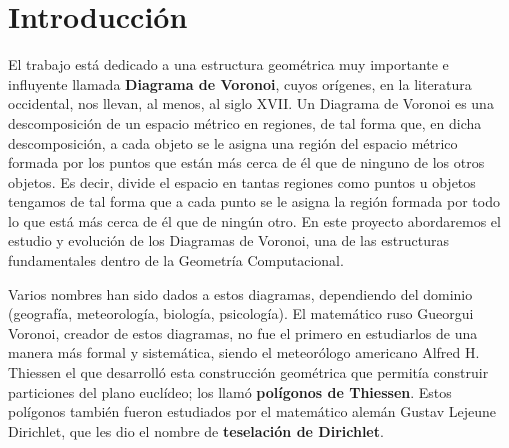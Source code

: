 \chapter{Introducción}

\pagestyle{fancy}


 El trabajo está dedicado a una estructura geométrica muy importante e influyente llamada \textbf{Diagrama de Voronoi}, cuyos orígenes, en la literatura occidental, nos llevan, al menos, al siglo XVII. Un Diagrama de Voronoi es una descomposición de un espacio métrico en regiones, de tal forma que, en dicha descomposición, a cada objeto se le asigna una región del espacio métrico formada por los puntos que están más cerca de él que de ninguno de los otros objetos. Es decir, divide el espacio en tantas regiones como puntos u objetos tengamos de tal forma que a cada punto se le asigna la región formada por todo lo que está más cerca de él que de ningún otro. En este proyecto abordaremos el estudio y evolución de los Diagramas de Voronoi, una de las estructuras fundamentales dentro de la Geometría Computacional.
 
 Varios nombres han sido dados a estos diagramas, dependiendo del dominio  (geografía, meteorología, biología, psicología). El matemático ruso Gueorgui  Voronoi, creador de estos diagramas, no fue el primero en estudiarlos de una manera más formal y sistemática, siendo el meteorólogo americano Alfred H. Thiessen el que desarrolló esta construcción geométrica que permitía construir particiones del plano euclídeo; los llamó \textbf{polígonos de Thiessen}. Estos polígonos también fueron estudiados por el matemático alemán Gustav Lejeune Dirichlet, que les dio el nombre de \textbf{teselación de Dirichlet}.
 
